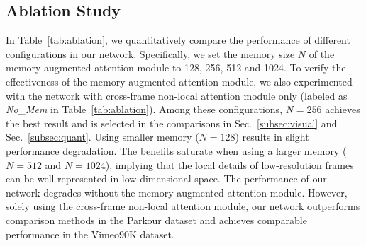 \subsection{Ablation Study}\label{subsec:ablation}
In Table~\ref{tab:ablation}, we quantitatively compare the performance of different configurations in our network.
Specifically, we set the memory size $N$ of the memory-augmented attention module to 128, 256, 512 and 1024.
To verify the effectiveness of the memory-augmented attention module, we also experimented with the network with cross-frame non-local attention module only (labeled as \textit{No\_Mem} in Table~\ref{tab:ablation}).
Among these configurations, $N=256$ achieves the best result and is selected in the comparisons in Sec.~\ref{subsec:visual} and Sec.~\ref{subsec:quant}.
Using smaller memory ($N=128$) results in slight performance degradation.
The benefits saturate when using a larger memory ($N=512$ and $N=1024$), implying that the local details of low-resolution frames can be well represented in low-dimensional space.
The performance of our network degrades without the memory-augmented attention module.
However, solely using the cross-frame non-local attention module, our network outperforms comparison methods in the Parkour dataset and achieves comparable performance in the Vimeo90K dataset.
